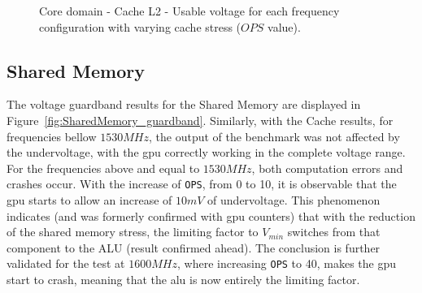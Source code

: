 \begin{figure}[!htb]
    \centering
    \begin{subfigmatrix}{2}
      \label{fig:CacheL2_guardband}
    \end{subfigmatrix}
    \caption{Core domain - Cache L2 - Usable voltage for each frequency configuration with varying cache stress ($OPS$ value).}
\end{figure}


\subsection{Shared Memory}

\label{sec:cache_guardband}

The voltage guardband results for the Shared Memory are displayed in Figure~\ref{fig:SharedMemory_guardband}. Similarly, with the Cache results, for frequencies bellow $1530MHz$, the output of the benchmark was not affected by the undervoltage, with the \acrshort{gpu} correctly working in the complete voltage range. For the frequencies above and equal to $1530MHz$, both computation errors and crashes occur. With the increase of \texttt{OPS}, from 0 to 10, it is observable that the \acrshort{gpu} starts to allow an increase of $10mV$ of undervoltage. This phenomenon indicates (and was formerly confirmed with \acrshort{gpu} counters) that with the reduction of the shared memory stress, the limiting factor to $V_{min}$ switches from that component to the ALU (result confirmed ahead). The conclusion is further validated for the test at $1600MHz$, where increasing  \texttt{OPS} to 40, makes the \acrshort{gpu} start to crash, meaning that the \acrshort{alu} is now entirely the limiting factor.

